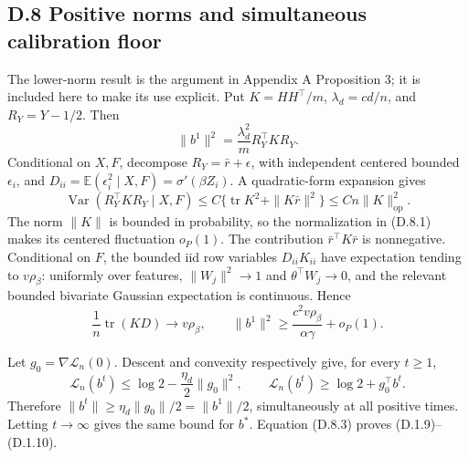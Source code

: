 \documentclass[
  11pt,
  a4paper,
]{article}
\begin{document}
\hypertarget{d.8-positive-norms-and-simultaneous-calibration-floor}{%
\subsection{D.8 Positive norms and simultaneous calibration
floor}\label{d.8-positive-norms-and-simultaneous-calibration-floor}}

The lower-norm result is the argument in Appendix A Proposition 3; it is
included here to make its use explicit. Put \(K=HH^\top/m\),
\(\lambda_d=cd/n\), and \(R_Y=Y-1/2\). Then \[
\|b^1\|^2=\frac{\lambda_d^2}{m}R_Y^\top K R_Y.
\tag{D.8.1}
\] Conditional on \(X,F\), decompose \(R_Y=\bar r+\epsilon\), with
independent centered bounded \(\epsilon_i\), and
\(D_{ii}=\mathbb E(\epsilon_i^2\mid X,F)=\sigma'(\beta Z_i)\). A
quadratic-form expansion gives \[
\operatorname{Var}(R_Y^\top KR_Y\mid X,F)
\leq C\{\operatorname{tr}K^2+\|K\bar r\|^2\}
\leq Cn\|K\|_{\mathrm{op}}^2.
\tag{D.8.2}
\] The norm \(\|K\|\) is bounded in probability, so the normalization in
(D.8.1) makes its centered fluctuation \(o_P(1)\). The contribution
\(\bar r^\top K\bar r\) is nonnegative. Conditional on \(F\), the
bounded iid row variables \(D_{ii}K_{ii}\) have expectation tending to
\(v\rho_\beta\): uniformly over features, \(\|W_j\|^2\to1\) and
\(\theta^\top W_j\to0\), and the relevant bounded bivariate Gaussian
expectation is continuous. Hence \[
\frac1n\operatorname{tr}(KD)\to v\rho_\beta,
\qquad
\|b^1\|^2\geq\frac{c^2v\rho_\beta}{\alpha\gamma}+o_P(1).
\tag{D.8.3}
\]

Let \(g_0=\nabla\mathcal L_n(0)\). Descent and convexity respectively
give, for every \(t\geq1\), \[
\mathcal L_n(b^t)\leq\log2-\frac{\eta_d}{2}\|g_0\|^2,
\qquad
\mathcal L_n(b^t)\geq\log2+g_0^\top b^t.
\] Therefore \(\|b^t\|\geq\eta_d\|g_0\|/2=\|b^1\|/2\), simultaneously at
all positive times. Letting \(t\to\infty\) gives the same bound for
\(b^*\). Equation (D.8.3) proves (D.1.9)--(D.1.10).
\end{document}
